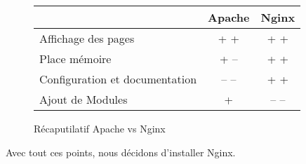\begin{figure}[H]
\begin{center}
\begin{tabular}{|m{175pt}|c|c|}
	\hline
	\null & \textbf{Apache} & \textbf{Nginx} \\
	\hline
	Affichage des pages & + + & + +\\
	\hline
	Place mémoire & + -- & + +\\
	\hline
	Configuration et documentation & -- -- & + + \\
	\hline
	Ajout de Modules & + & -- --  \\
	\hline
\end{tabular} \vspace*{5mm}
\caption{Récaputilatif Apache vs Nginx}
\end{center}
\end{figure}


Avec tout ces points, nous décidons d'installer Nginx.
